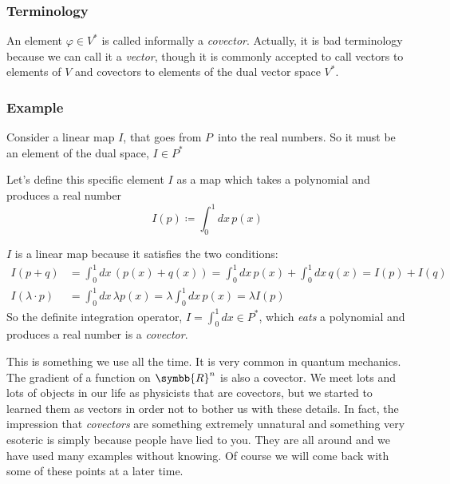 \subsubsection{Terminology}
An element $\varphi\in V^\ast$ is called informally a \emph{covector}.
Actually, it is bad terminology because we can call it a \emph{vector}, though it is commonly
accepted to call vectors to elements of $V$ and covectors to elements of the dual vector space
$V^\ast$.

\subsubsection{Example}
Consider a linear map $I$, that goes from $P$ \,into the real numbers. So it must be an element
of the dual space, $I\in P^\ast$
\begin{center}
\end{center}

Let's define this specific element $I$ as a map which takes a polynomial and produces
a real number
\[
  I(p) \coloneq \int_0^1 dx\, p(x)
\]

$I$ is a linear map because it satisfies the two conditions:
\begin{align*}
  I(p+q) &= \int_0^1 dx\, (p(x) + q(x)) = \int_0^1 dx\, p(x) + \int_0^1 dx\, q(x) = I(p) + I(q)\\
  I(\lambda\cdot p) &= \int_0^1 dx\, \lambda p(x) = \lambda \int_0^1 dx\,p(x) = \lambda I(p)
\end{align*}
So the definite integration operator, $I=\int_0^1 dx\in P^\ast$, which \emph{eats} a polynomial and
produces a real number is a \emph{covector}.

This is something we use all the time. It is very common in quantum mechanics.
The gradient of a function on $\symbb{R}^n$ is also a covector.
We meet lots and lots of objects in our life as physicists that are covectors, but we started
to learned them as vectors in order not to bother us with these details. In fact, the impression
that \emph{covectors} are something extremely unnatural and something very esoteric is simply
because people have lied to you. They are all around and we have used many examples without
knowing. Of course we will come back with some of these points at a later time.

